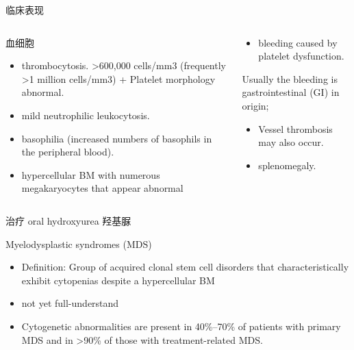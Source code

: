 \documentclass[
  ignorenonframetext,
]{beamer}
\providecommand{\tightlist}{%
  \setlength{\itemsep}{0pt}\setlength{\parskip}{0pt}}
\begin{document}
\begin{frame}
\begin{block}{临床表现}
\protect\hypertarget{ux4e34ux5e8aux8868ux73b0-3}{}
\begin{columns}[T]
\begin{column}{0.3\textwidth}
\begin{block}{血细胞}
\protect\hypertarget{ux8840ux7ec6ux80de}{}
\begin{itemize}
\item
  thrombocytosis. \textgreater600,000 cells/mm3 (frequently
  \textgreater1 million cells/mm3) + Platelet morphology abnormal.
\item
  mild neutrophilic leukocytosis.
\item
  basophilia (increased numbers of basophils in the peripheral blood).
\item
  hypercellular BM with numerous megakaryocytes that appear abnormal
\end{itemize}
\end{block}
\end{column}

\begin{column}{0.3\textwidth}
\begin{itemize}
\tightlist
\item
  bleeding caused by platelet dysfunction.
\end{itemize}

Usually the bleeding is gastrointestinal (GI) in origin;

\begin{itemize}
\item
  Vessel thrombosis may also occur.
\item
  splenomegaly.
\end{itemize}
\end{column}
\end{columns}
\end{block}
\end{frame}

\begin{frame}
\begin{block}{治疗}
\protect\hypertarget{ux6cbbux7597-4}{}
oral hydroxyurea 羟基脲
\end{block}
\end{frame}

\begin{frame}
\begin{block}{Myelodysplastic syndromes (MDS)}
\protect\hypertarget{myelodysplastic-syndromes-mds}{}
\begin{itemize}
\item
  Definition: Group of acquired clonal stem cell disorders that
  characteristically exhibit cytopenias despite a hypercellular BM
\item
  not yet full-understand
\item
  Cytogenetic abnormalities are present in 40\%--70\% of patients with
  primary MDS and in \textgreater90\% of those with treatment-related
  MDS.
\end{itemize}
\end{block}
\end{frame}
\end{document}
